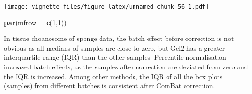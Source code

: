 \documentclass[]{book}
\newenvironment{Shaded}{\begin{snugshade}}{\end{snugshade}}
\newcommand{\KeywordTok}[1]{\textcolor[rgb]{0.13,0.29,0.53}{\textbf{#1}}}
\newcommand{\DataTypeTok}[1]{\textcolor[rgb]{0.13,0.29,0.53}{#1}}
\newcommand{\DecValTok}[1]{\textcolor[rgb]{0.00,0.00,0.81}{#1}}
\newcommand{\NormalTok}[1]{#1}
\begin{document}
\texttt{[image: vignette\_files/figure-latex/unnamed-chunk-56-1.pdf]}

\begin{Shaded}
\begin{Highlighting}[]
\KeywordTok{par}\NormalTok{(}\DataTypeTok{mfrow =} \KeywordTok{c}\NormalTok{(}\DecValTok{1}\NormalTok{,}\DecValTok{1}\NormalTok{))}
\end{Highlighting}
\end{Shaded}

In tissue choanosome of sponge data, the batch effect before correction
is not obvious as all medians of samples are close to zero, but Gel2 has
a greater interquartile range (IQR) than the other samples. Percentile
normalisation increased batch effects, as the samples after correction
are deviated from zero and the IQR is increased. Among other methods,
the IQR of all the box plots (samples) from different batches is
consistent after ComBat correction.
\end{document}
